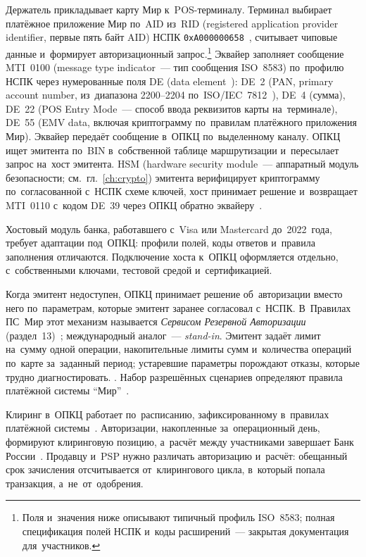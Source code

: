 Держатель прикладывает карту Мир к~POS-терминалу. Терминал выбирает платёжное
приложение Мир по~AID из~RID (registered
application provider identifier, первые пять байт AID) НСПК
\texttt{0xA000000658}~\cite{iso-7816-5,eftlab-rid}, считывает чиповые данные и~формирует
авторизационный запрос.\footnote{Поля и~значения ниже описывают типичный
  профиль ISO~8583; полная спецификация полей НСПК и~коды расширений~---
закрытая документация для~участников.} Эквайер заполняет сообщение
MTI~0100 (message type indicator~--- тип сообщения ISO~8583) по~профилю
НСПК через нумерованные поля DE (data element~\cite{iso-8583-2023}): DE~2
(PAN, primary account number, из~диапазона 2200--2204
по~ISO/IEC~7812~\cite{iso-7812-transition}), DE~4 (сумма), DE~22 (POS Entry
Mode~--- способ ввода реквизитов карты на~терминале), DE~55 (EMV data, включая
криптограмму по~правилам платёжного приложения Мир). Эквайер передаёт сообщение
в~ОПКЦ по~выделенному каналу. ОПКЦ ищет эмитента по~BIN в~собственной таблице
маршрутизации и~пересылает запрос на~хост эмитента. HSM (hardware security
module~--- аппаратный модуль безопасности; см.~гл.~\ref{ch:crypto}) эмитента
верифицирует криптограмму по~согласованной с~НСПК схеме ключей, хост принимает
решение и~возвращает MTI~0110 с~кодом DE~39 через ОПКЦ обратно
эквайеру~\cite{nspk-about-company,fz-161}.

Хостовый модуль банка, работавшего с~Visa или Mastercard до~2022~года, требует
адаптации под~ОПКЦ: профили полей, коды ответов и~правила заполнения
отличаются. Подключение хоста к~ОПКЦ оформляется отдельно, с~собственными
ключами, тестовой средой и~сертификацией.

Когда эмитент недоступен, ОПКЦ принимает решение об~авторизации вместо него
по~параметрам, которые эмитент заранее согласовал с~НСПК. В~Правилах ПС~Мир
этот механизм называется \emph{Сервисом Резервной Авторизации}
(раздел~13)~\cite{nspk-mir-rules-v43}; международный аналог~---
\textit{stand-in}. Эмитент задаёт лимит на~сумму одной операции, накопительные
лимиты сумм и~количества операций по~карте за~заданный период; устаревшие
параметры порождают отказы, которые трудно диагностировать. . Набор разрешённых
сценариев определяют правила платёжной системы
\enquote{Мир}~\cite{nspk-mir-rules,nspk-mir-rules-v43}.

Клиринг в~ОПКЦ работает по~расписанию, зафиксированному в~правилах платёжной
системы~\cite{nspk-mir-rules}. Авторизации, накопленные за~операционный день,
формируют клиринговую позицию, а~расчёт между участниками завершает Банк
России~\cite{fz-161,cbr-876p}. Продавцу и~PSP нужно различать авторизацию
и~расчёт: обещанный срок зачисления отсчитывается от~клирингового цикла,
в~который попала транзакция, а~не~от~одобрения.

